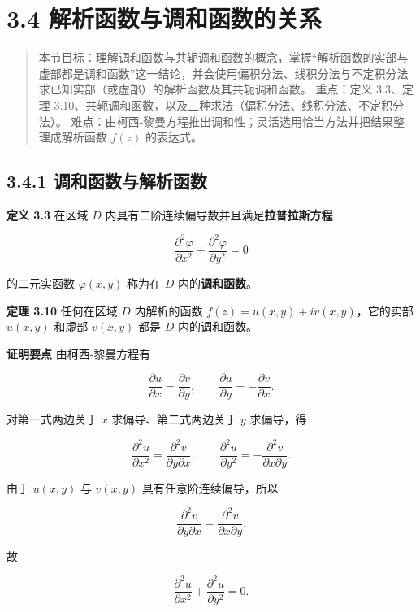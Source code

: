\section{3.4
解析函数与调和函数的关系}\label{ux89e3ux6790ux51fdux6570ux4e0eux8c03ux548cux51fdux6570ux7684ux5173ux7cfb}

\begin{quote}
本节目标：理解调和函数与共轭调和函数的概念，掌握``解析函数的实部与虚部都是调和函数''这一结论，并会使用偏积分法、线积分法与不定积分法求已知实部（或虚部）的解析函数及其共轭调和函数。
重点：定义 3.3、定理
3.10、共轭调和函数，以及三种求法（偏积分法、线积分法、不定积分法）。
难点：由柯西-黎曼方程推出调和性；灵活选用恰当方法并把结果整理成解析函数
\(f(z)\) 的表达式。
\end{quote}

\subsection{3.4.1
调和函数与解析函数}\label{ux8c03ux548cux51fdux6570ux4e0eux89e3ux6790ux51fdux6570}

\textbf{定义 3.3} 在区域 \(D\)
内具有二阶连续偏导数并且满足\textbf{拉普拉斯方程}

\[
\frac{\partial^2\varphi}{\partial x^2}+\frac{\partial^2\varphi}{\partial y^2}=0
\]

的二元实函数 \(\varphi(x,y)\) 称为在 \(D\) 内的\textbf{调和函数}。

\textbf{定理 3.10} 任何在区域 \(D\) 内解析的函数
\(f(z)=u(x,y)+iv(x,y)\)，它的实部 \(u(x,y)\) 和虚部 \(v(x,y)\) 都是
\(D\) 内的调和函数。

\textbf{证明要点} 由柯西-黎曼方程有

\[
\frac{\partial u}{\partial x}=\frac{\partial v}{\partial y},\qquad
\frac{\partial u}{\partial y}=-\frac{\partial v}{\partial x}.
\]

对第一式两边关于 \(x\) 求偏导、第二式两边关于 \(y\) 求偏导，得

\[
\frac{\partial^2 u}{\partial x^2}=\frac{\partial^2 v}{\partial y\partial x},\qquad
\frac{\partial^2 u}{\partial y^2}=-\frac{\partial^2 v}{\partial x\partial y}.
\]

由于 \(u(x,y)\) 与 \(v(x,y)\) 具有任意阶连续偏导，所以

\[
\frac{\partial^2 v}{\partial y\partial x}=\frac{\partial^2 v}{\partial x\partial y}.
\]

故

\[
\frac{\partial^2 u}{\partial x^2}+\frac{\partial^2 u}{\partial y^2}=0 .
\]

